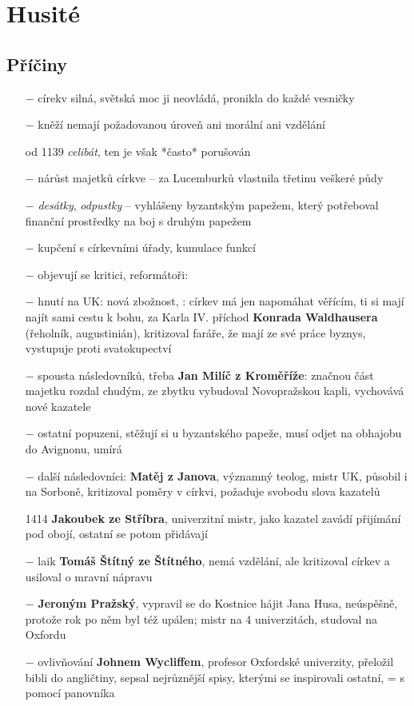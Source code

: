 \documentclass{article}
\begin{document}
\section*{Husité}
\subsection*{Příčiny}
\begin{itemize}
    \vspace{-0.5em}
    \setlength\itemsep{0.15em}
    \item[$-$] círekv silná, světská moc ji neovládá, pronikla do každé vesničky
    \item[$-$] kněží nemají požadovanou úroveň ani morální ani vzdělání
    \item[od 1139] \textit{celibát}, ten je však *často* porušován
    \item[$-$] nárůst majetků církve -- za Lucemburků vlastnila třetinu veškeré půdy
    \item[$-$] \textit{desátky}, \textit{odpustky} -- vyhlášeny byzantským papežem, který potřeboval finanční prostředky na boj s druhým papežem
    \item[$-$] kupčení s církevními úřady, kumulace funkcí
    \item[$-$] objevují se kritici, reformátoři: 
    \item[$-$] hnutí na UK: nová zbožnost, : církev má jen napomáhat věřícím, ti si mají najít sami cestu k bohu, za Karla IV. příchod \textbf{Konrada Waldhausera} (řeholník, augustinián), kritizoval faráře, že mají ze své práce byznys, vystupuje proti svatokupectví
    \item[$-$] spousta následovníků, třeba \textbf{Jan Milíč z Kroměříže}: značnou část majetku rozdal chudým, ze zbytku vybudoval Novopražskou kapli, vychovává nové kazatele
    \item[$-$] ostatní popuzeni, stěžují si u byzantského papeže, musí odjet na obhajobu do Avignonu, umírá
    \item[$-$] další následovníci: \textbf{Matěj z Janova}, významný teolog, mistr UK, působil i na Sorboně, kritizoval poměry v církvi, požaduje svobodu slova kazatelů
    \item[1414] \textbf{Jakoubek ze Stříbra}, univerzitní mistr, jako kazatel zavádí přijímání pod obojí, ostatní se potom přidávají
    \item[$-$] laik \textbf{Tomáš Štítný ze Štítného}, nemá vzdělání, ale kritizoval církev a usiloval o mravní nápravu
    \item[$-$] \textbf{Jeroným Pražský}, vypravil se do Kostnice hájit Jana Husa, neúspěšně, protože rok po něm byl též upálen; mistr na 4 univerzitách, studoval na Oxfordu
    \item[$-$] ovlivňování \textbf{Johnem Wycliffem}, profesor Oxfordské univerzity, přeložil bibli do angličtiny, sepsal nejrůznější spisy, kterými se inspirovali ostatní,  = s pomocí panovníka
\end{itemize}
\end{document}
